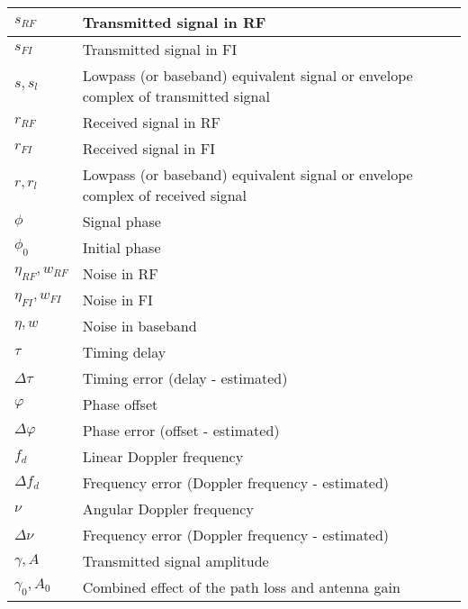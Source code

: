 \begin{xltabular}{\textwidth}{XX}
	\(s_{RF}\)            & Transmitted signal in RF                                                          \\ \hline
	\(s_{FI}\)            & Transmitted signal in FI                                                          \\ \hline
	\(s, s_l\)            & Lowpass (or baseband) equivalent signal or envelope complex of transmitted signal \\ \hline
	\(r_{RF}\)            & Received signal in RF                                                             \\ \hline
	\(r_{FI}\)            & Received signal in FI                                                             \\ \hline
	\(r, r_l\)            & Lowpass (or baseband) equivalent signal or envelope complex of received signal    \\ \hline
	\(\phi\)              & Signal phase                                                                      \\ \hline
	\(\phi_0\)            & Initial phase                                                                     \\ \hline
	\(\eta_{RF}, w_{RF}\) & Noise in RF                                                                       \\ \hline
	\(\eta_{FI}, w_{FI}\) & Noise in FI                                                                       \\ \hline
	\(\eta, w\)           & Noise in baseband                                                                 \\ \hline
	\(\tau\)              & Timing delay                                                                      \\ \hline
	\(\Delta\tau\)        & Timing error (delay - estimated)                                                  \\ \hline
	\(\varphi\)           & Phase offset                                                                      \\ \hline
	\(\Delta\varphi\)     & Phase error (offset - estimated)                                                  \\ \hline
	\(f_d\)               & Linear Doppler frequency                                                          \\ \hline
	\(\Delta f_d\)        & Frequency error (Doppler frequency - estimated)                                   \\ \hline
	\(\nu\)               & Angular Doppler frequency                                                         \\ \hline
	\(\Delta \nu\)        & Frequency error (Doppler frequency - estimated)                                   \\ \hline
	\(\gamma, A\)         & Transmitted signal amplitude                                                      \\ \hline
	\(\gamma_0, A_0\)     & Combined effect of the path loss and antenna gain
\end{xltabular}
